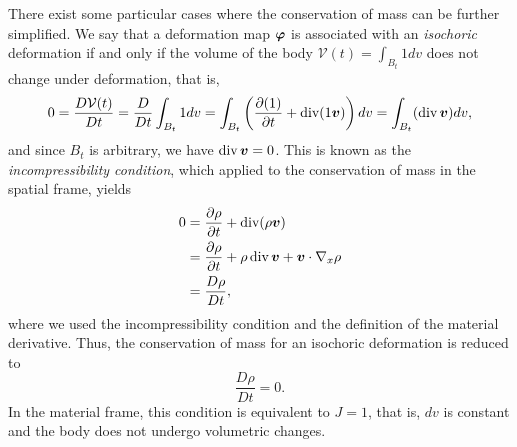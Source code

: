 There exist some particular cases where the conservation of mass can be further simplified. We say that a deformation map $\vvarphi$ is associated with an \textit{isochoric} deformation if and only if the volume of the body $\mathcal{V}(t) = \int_{B_t}1dv$ does not change under deformation, that is, 
\begin{equation*}
    0 = \frac{D\mathcal{V}(t)}{Dt} = \frac{D}{Dt} \int_{B_t} 1dv = \int_{B_t} \left(\frac{\partial (1)}{\partial t} + \dive(1\vec v)\right)dv = \int_{B_t} (\dive\vec v)dv,
\end{equation*}
and since $B_t$ is arbitrary, we have $\dive \vec v = 0$. This is known as the \textit{incompressibility condition}, which applied to the conservation of mass in the spatial frame, yields
\begin{align*}
    0 &= \frac{\partial\rho}{\partial t} + \dive(\rho\vec v) \\
    &= \frac{\partial\rho}{\partial t} + \rho\dive\vec v + \vec v \cdot\vx \rho\\
    &= \frac{D\rho}{Dt},
\end{align*}
where we used the incompressibility condition and the definition of the material derivative. Thus, the conservation of mass for an isochoric deformation is reduced to 
\begin{equation*}
    \frac{D\rho}{Dt} = 0.
\end{equation*}
In the material frame, this condition is equivalent to $J=1$, that is, $dv$ is constant and the body does not undergo volumetric changes. 
